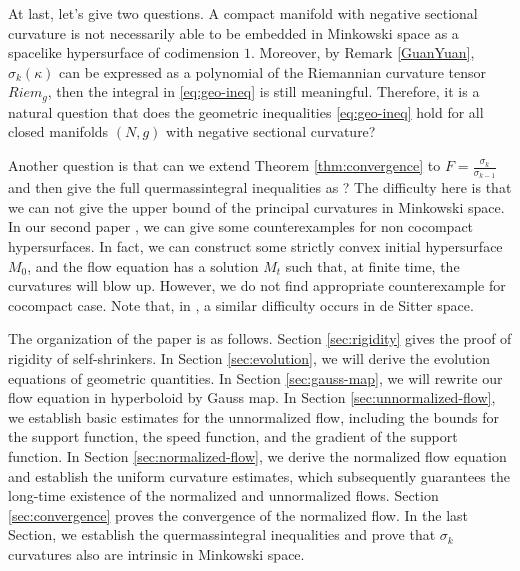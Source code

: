 \documentclass[10pt,a4paper]{amsart}
\numberwithin{equation}{section}
\begin{document}
At last, let's give two questions. 
A compact manifold with negative sectional curvature is not necessarily able to be embedded in Minkowski space as a spacelike hypersurface of codimension \(1\). Moreover, by Remark \ref{GuanYuan}, \(\sigma_k(\kappa)\) can be expressed as a polynomial of the Riemannian curvature tensor \(Riem_g\), then the integral in \eqref{eq:geo-ineq} is still meaningful.
Therefore, it is a natural question that 
does the geometric inequalities \eqref{eq:geo-ineq} hold for all closed manifolds \((N,g)\) with negative sectional curvature? 

Another question is that can we extend Theorem \ref{thm:convergence} to $F=\frac{\sigma_k}{\sigma_{k-1}}$ and then give the full quermassintegral inequalities as \cite{Guan2009} ? The difficulty here is that we can not give the upper bound of the principal curvatures in Minkowski space. In our second paper \cite{LiWYin}, we can give some counterexamples for non cocompact hypersurfaces. In fact, we can construct some strictly convex initial hypersurface $M_0$, and the flow equation has a solution $M_t$ such that, at finite time, the curvatures will blow up. However, we do not find appropriate counterexample for cocompact case. Note that, in \cite{HuLi},  a similar difficulty occurs in de Sitter space. 



The organization of the paper is as follows. Section \ref{sec:rigidity} gives the proof of rigidity of self-shrinkers. In Section \ref{sec:evolution}, we will derive the evolution equations of geometric quantities. In Section \ref{sec:gauss-map}, we will rewrite our flow equation in hyperboloid by Gauss map. In Section \ref{sec:unnormalized-flow}, we establish basic estimates for the unnormalized flow, including the bounds for the support function, the speed function, and the gradient of the support function. In Section \ref{sec:normalized-flow}, we derive the normalized flow equation and establish the uniform curvature estimates, which subsequently guarantees the long-time existence of the normalized and unnormalized flows. Section \ref{sec:convergence} proves the convergence of the normalized flow. In the last Section, we establish the quermassintegral inequalities and prove that $\sigma_k$ curvatures also are intrinsic in Minkowski space.
\end{document}

